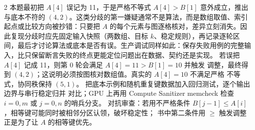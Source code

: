 \begin{solutionexercise}{2}
本题最初把 $A[4]$ 误记为 11，于是严格不等式 $A[4]>B[1]$ 意外成立，推出与底本不符的 $(4,2)$。这类分歧的第一嫌疑通常不是算法，而是数组取值、索引起点或比较方向被抄错：只要把 $A$ 的每个元素与图逐格核对，差异立刻消失。因此复现分歧时应先固定输入快照（两数组、目标 $k$、稳定规则），再记录逐轮区间，最后才讨论算法或底本是否有误。生产调试同样如此：保存失败用例的完整输入，比只保留断言失败的终点更能定位问题出在数据、契约还是实现。
\variantheading 若误把 $A[4]$ 记成 11，则第 0 轮会满足 $A[4]=11>B[1]=10$ 并触发
调整，最终得到 $(4,2)$；这说明必须按图核对数组值。真实的 $A[4]=10$ 不满足严格
不等式，协同秩保持 $(5,1)$。
\practiceheading 把底本示例和随机重复键数据加入回归测试，逐个输出边界与串行稳定归并
对比；GPU 上再用 Compute Sanitizer memcheck 检查 $i=0,m$ 或 $j=0,n$ 的哨兵分支。
对抗审查：若用不严格条件 $B[j-1]\le A[i]$，相等键可能同时被相邻分区认领，破坏稳定性；
书中第二条件用 $\ge$ 触发调整正是为了让 $A$ 的相等键优先。
\end{solutionexercise}

